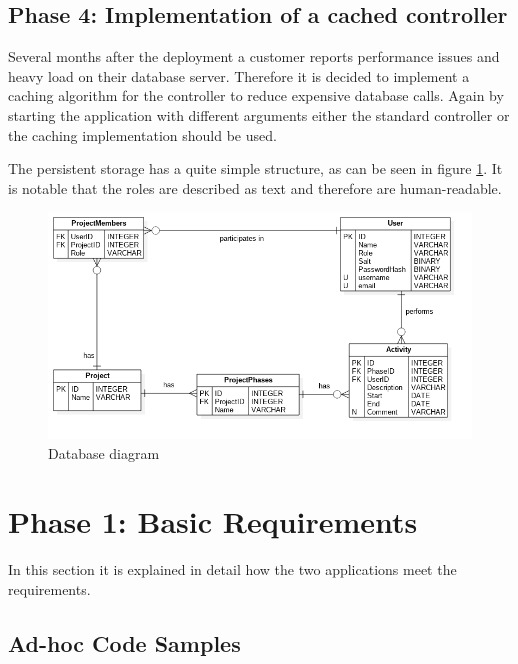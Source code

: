 \subsection{Phase 4: Implementation of a cached controller}
Several months after the deployment a customer reports performance issues and heavy load on their database server. Therefore it is decided to implement a caching algorithm for the controller to reduce expensive database calls. Again by starting the application with different arguments either the standard controller or the caching implementation should be used.


The persistent storage has a quite simple structure, as can be seen in figure \ref{fig:database}. It is notable that the roles are described as text and therefore are human-readable. 
\begin{figure}[htbp]
\includegraphics[width=\textwidth]{./content/pictures/database.png}
\caption{Database diagram}
\label{fig:database}
\end{figure}

\clearpage

\section{Phase 1: Basic Requirements}
In this section it is explained in detail how the two applications meet the requirements.

\subsection{Ad-hoc Code Samples}

